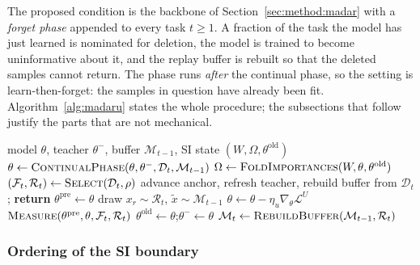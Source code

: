 The proposed condition is the backbone of Section~\ref{sec:method:madar} with a
\emph{forget phase} appended to every task $t \ge 1$. A fraction of the task the
model has just learned is nominated for deletion, the model is trained to become
uninformative about it, and the replay buffer is rebuilt so that the deleted
samples cannot return. The phase runs \emph{after} the continual phase, so the
setting is learn-then-forget: the samples in question have already been fit.
Algorithm~\ref{alg:madaru} states the whole procedure; the subsections that
follow justify the parts that are not mechanical.

\begin{algorithm}[t]
\caption{MADAR${+}$Unlearning, one task $t \ge 1$}
\label{alg:madaru}
\begin{algorithmic}[1]
  \Require model $\theta$, teacher $\theta^{-}$, buffer $\mathcal{M}_{t-1}$,
           SI state $(W,\Omega,\theta^{\text{old}})$
  \State $\theta \gets \textsc{ContinualPhase}(\theta,\theta^{-},\mathcal{D}_t,\mathcal{M}_{t-1})$
  \State $\Omega \gets \textsc{FoldImportances}(W,\theta,\theta^{\text{old}})$
  \State $(\mathcal{F}_t, \mathcal{R}_t) \gets \textsc{Select}(\mathcal{D}_t, \rho)$
      \State advance anchor, refresh teacher, rebuild buffer from $\mathcal{D}_t$;
             \textbf{return}
  \EndIf
  \State $\theta^{\text{pre}} \gets \theta$ 
      \State draw $x_r \sim \mathcal{R}_t$, \; $\tilde{x} \sim \mathcal{M}_{t-1}$
      \State $\theta \gets \theta - \eta_u \nabla_\theta \mathcal{L}^{U}$
    \EndFor
  \EndFor
  \State $\textsc{Measure}(\theta^{\text{pre}}, \theta, \mathcal{F}_t, \mathcal{R}_t)$
  \State $\theta^{\text{old}} \gets \theta$;\quad $\theta^{-} \gets \theta$
  \State $\mathcal{M}_t \gets \textsc{RebuildBuffer}(\mathcal{M}_{t-1}, \mathcal{R}_t)$
\end{algorithmic}
\end{algorithm}

\subsubsection{Ordering of the SI boundary}
\label{sec:method:order}

